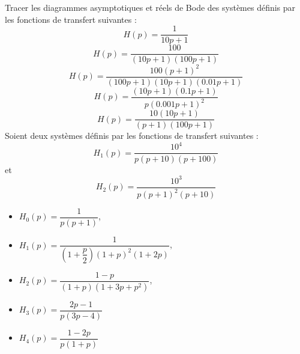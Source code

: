 Tracer les diagrammes asymptotiques et réels de Bode des systèmes définis
par les fonctions de transfert suivantes :
\question{}
\[
H(p) = \dfrac{1}{10p+1}
\]
\question{}
\[
H(p) = \dfrac{100}{(10p+1)(100p+1)}
\]
\question{}
\[
H(p) = \dfrac{100(p+1)^2}{(100p+1)(10p+1)(0.01p+1)}
\]
\question{}
\[
H(p) = \dfrac{(10p+1)(0.1p+1)}{p(0.001p+1)^2}
\]
\question{}
\[
H(p) = \dfrac{10(10p+1)}{(p+1)(100p+1)}
\]
Soient deux systèmes définis par les fonctions de transfert suivantes :
\[
H_1(p) =\dfrac{10^4}{p(p+10)(p+100)}
\]
et
\[
H_2(p) =\dfrac{10^3}{p(p+1)^2(p+10)}
\]
\begin{itemize}
    \item $H_0(p)=\dfrac{1}{p(p+1)}$,
    \item $H_1(p)=\dfrac{1}{\left(1+\dfrac{p}{2}\right)(1+p)^2(1+2p)}$,
    \item $H_2(p)=\dfrac{1-p}{(1+p)(1+3p+p^2)}$,
    \item $H_3(p)=\dfrac{2p-1}{p(3p-4)}$
    \item $H_4(p)=\dfrac{1-2p}{p(1+p)}$
\end{itemize}
